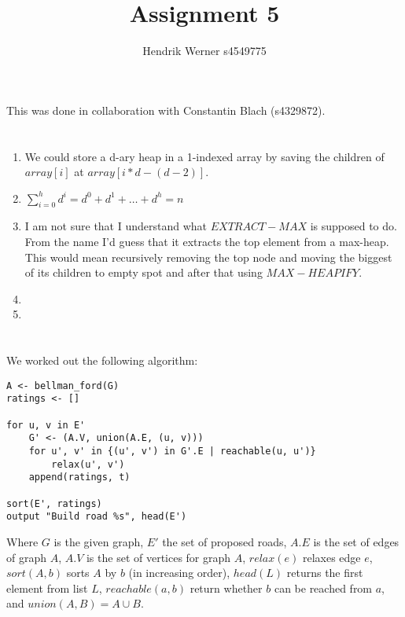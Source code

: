 \documentclass[12pt]{article}
\title {Assignment 5}
\author {Hendrik Werner s4549775}
\begin{document}
\maketitle

This was done in collaboration with Constantin Blach (s4329872).

\section{} %
\begin{enumerate}[a]
	\item %
	We could store a d-ary heap in a 1-indexed array by saving the children of $array[i]$ at $array[i * d - (d - 2)]$.

	\item %
	$\sum_{i = 0}^{h} d^i = d^0 + d^1 + \dots + d^h = n$

	\item %
	I am not sure that I understand what $EXTRACT-MAX$ is supposed to do. From the name I'd guess that it extracts the top element from a max-heap. This would mean recursively removing the top node and moving the biggest of its children to empty spot and after that using $MAX-HEAPIFY$.

	\item %
	\item %
\end{enumerate}

\section{} %
We worked out the following algorithm:

\begin{lstlisting}
A <- bellman_ford(G)
ratings <- []

for u, v in E'
	G' <- (A.V, union(A.E, (u, v)))
	for u', v' in {(u', v') in G'.E | reachable(u, u')}
		relax(u', v')
	append(ratings, t)

sort(E', ratings)
output "Build road %s", head(E')
\end{lstlisting}

Where $G$ is the given graph, $E'$ the set of proposed roads, $A.E$ is the set of edges of graph $A$, $A.V$ is the set of vertices for graph $A$, $relax(e)$ relaxes edge $e$, $sort(A, b)$ sorts $A$ by $b$ (in increasing order), $head(L)$ returns the first element from list $L$, $reachable(a, b)$ return whether $b$ can be reached from $a$, and $union(A, B) = A \cup B$.
\end{document}
